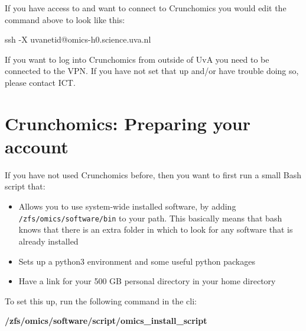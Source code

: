 \documentclass[
  letterpaper,
  DIV=11,
  numbers=noendperiod]{scrreprt}
\newenvironment{Shaded}{}{}
\newcommand{\AttributeTok}[1]{\textcolor[rgb]{0.84,0.23,0.29}{#1}}
\newcommand{\ExtensionTok}[1]{\textcolor[rgb]{0.84,0.23,0.29}{\textbf{#1}}}
\newcommand{\FunctionTok}[1]{\textcolor[rgb]{0.44,0.26,0.76}{#1}}
\newcommand{\NormalTok}[1]{\textcolor[rgb]{0.14,0.16,0.18}{#1}}
\providecommand{\tightlist}{%
  \setlength{\itemsep}{0pt}\setlength{\parskip}{0pt}}\usepackage{longtable,booktabs,array}
\begin{document}
If you have access to and want to connect to Crunchomics you would edit
the command above to look like this:

\begin{Shaded}
\begin{Highlighting}[]
\FunctionTok{ssh} \AttributeTok{{-}X}\NormalTok{ uvanetid@omics{-}h0.science.uva.nl}
\end{Highlighting}
\end{Shaded}

\begin{tcolorbox}[enhanced jigsaw, opacitybacktitle=0.6, titlerule=0mm, colbacktitle=quarto-callout-important-color!10!white, arc=.35mm, leftrule=.75mm, colframe=quarto-callout-important-color-frame, opacityback=0, bottomtitle=1mm, toprule=.15mm, coltitle=black, toptitle=1mm, title=\textcolor{quarto-callout-important-color}{\faExclamation}\hspace{0.5em}{Important}, breakable, rightrule=.15mm, bottomrule=.15mm, colback=white, left=2mm]

If you want to log into Crunchomics from outside of UvA you need to be
connected to the VPN. If you have not set that up and/or have trouble
doing so, please contact ICT.

\end{tcolorbox}

\section{Crunchomics: Preparing your
account}\label{crunchomics-preparing-your-account}

If you have not used Crunchomics before, then you want to first run a
small Bash script that:

\begin{itemize}
\tightlist
\item
  Allows you to use system-wide installed software, by adding
  \texttt{/zfs/omics/software/bin} to your path. This basically means
  that bash knows that there is an extra folder in which to look for any
  software that is already installed
\item
  Sets up a python3 environment and some useful python packages
\item
  Have a link for your 500 GB personal directory in your home directory
\end{itemize}

To set this up, run the following command in the cli:

\begin{Shaded}
\begin{Highlighting}[]
\ExtensionTok{/zfs/omics/software/script/omics\_install\_script}
\end{Highlighting}
\end{Shaded}
\end{document}
